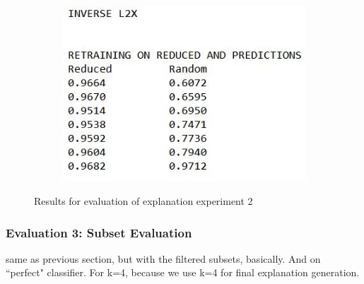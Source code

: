 {\begin{figure}[H]
\begin{subfigure}[b]{0.4\textwidth}
	\end{subfigure}
	\begin{subfigure}[b]{0.4\textwidth}
		\includegraphics[width=\textwidth]{img/expleval2_invL2X.JPG}
	\end{subfigure}
	\caption{Results for evaluation of explanation experiment 2}
	\label{fig:results_expleval2}
\end{figure}



\subsubsection{Evaluation 3: Subset Evaluation}
same as previous section, but with the filtered subsets, basically. And on ``perfect" classifier. For k=4, because we use k=4 for final explanation generation.
}


